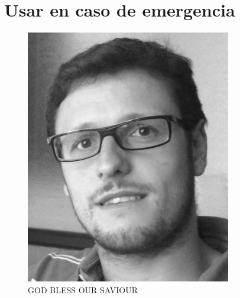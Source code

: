 \documentclass[oneside]{book}
\begin{document}
	\section{Usar en caso de emergencia}
	\begin{figure}[h]
		\centering
		\includegraphics[width=0.8\textwidth]{foto}
		\caption*{GOD BLESS OUR SAVIOUR}
	\end{figure}
\end{document}
